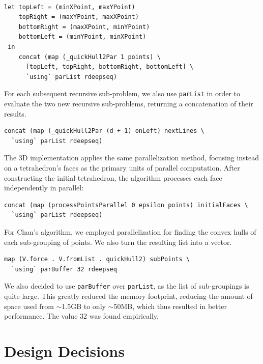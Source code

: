 \documentclass[12pt]{article}
\begin{document}
    \begin{verbatim}

let topLeft = (minXPoint, maxYPoint)
    topRight = (maxYPoint, maxXPoint)
    bottomRight = (maxXPoint, minYPoint)
    bottomLeft = (minYPoint, minXPoint)
 in
    concat (map (_quickHull2Par 1 points) \
      [topLeft, topRight, bottomRight, bottomLeft] \
      `using` parList rdeepseq)

    \end{verbatim}

    For each subsequent recursive sub-problem, we also use \texttt{parList} in order to evaluate the two new recursive sub-problems, returning a concatenation of their results.

\begin{verbatim}
concat (map (_quickHull2Par (d + 1) onLeft) nextLines \
  `using` parList rdeepseq)
\end{verbatim}

  The 3D implementation applies the same parallelization method, focusing instead on a tetrahedron's faces as the primary units of parallel computation. After constructing the initial tetrahedron, the algorithm processes each face independently in parallel:

\begin{verbatim}
concat (map (processPointsParallel 0 epsilon points) initialFaces \
  `using` parList rdeepseq)
\end{verbatim}

	For Chan’s algorithm, we employed parallelization for finding the convex hulls of each sub-grouping of points. We also turn the resulting list into a vector.

\begin{verbatim}
map (V.force . V.fromList . quickHull2) subPoints \
  `using` parBuffer 32 rdeepseq
\end{verbatim}

  We also decided to use \texttt{parBuffer} over \texttt{parList}, as the list of sub-groupings is quite large. This greatly reduced the memory footprint, reducing the amount of space used from $\sim$1.5GB to only $\sim$50MB, which thus resulted in better performance. The value 32 was found empirically.

  \section{Design Decisions}
\end{document}
